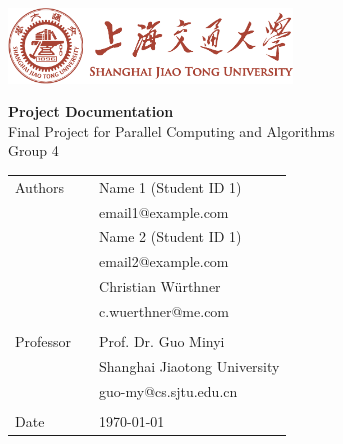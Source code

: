 \begin{titlepage}
\pagestyle{empty}

\begin{center}
\includegraphics[height=2cm]{content/graphics/sjtubannerred.pdf}
\end{center}

\vspace{20 mm}

\begin{center}
{\fontsize{28}{28} \selectfont
\textbf{Project Documentation}}\\[5mm] 
{\fontsize{16}{22}
\selectfont Final Project for Parallel Computing and Algorithms\\Group 4}
\end{center}

\vfill
\begin{tabular}{lcl}
Authors     &&    Name 1 (Student ID 1)\\ 
            &&    email1@example.com\\
            &&    Name 2 (Student ID 1)\\
            &&    email2@example.com\\
            &&    Christian Würthner\\
            &&    c.wuerthner@me.com\\\\
Professor   &&    Prof. Dr. Guo Minyi\\ 
            &&    Shanghai Jiaotong University\\
            &&    guo-my@cs.sjtu.edu.cn\\\\
Date	        &&    \today\\ 
\end{tabular}
\end{titlepage}